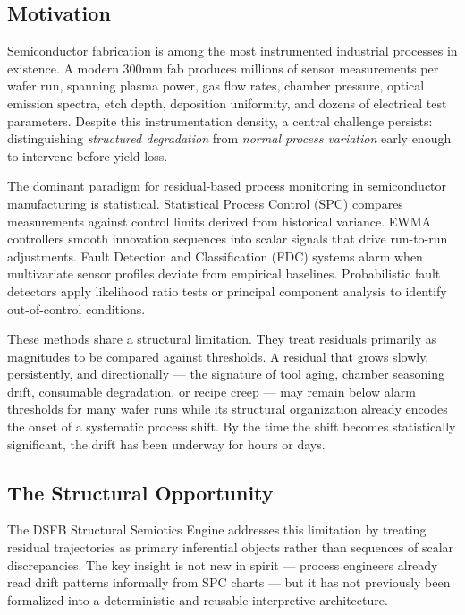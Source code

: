 \documentclass[11pt,letterpaper]{article}
\theoremstyle{scresult}
\begin{document}
\subsection{Motivation}

Semiconductor fabrication is among the most instrumented industrial processes
in existence. A modern 300mm fab produces millions of sensor measurements per
wafer run, spanning plasma power, gas flow rates, chamber pressure, optical
emission spectra, etch depth, deposition uniformity, and dozens of electrical
test parameters. Despite this instrumentation density, a central challenge
persists: distinguishing \emph{structured degradation} from \emph{normal
process variation} early enough to intervene before yield loss.

The dominant paradigm for residual-based process monitoring in semiconductor
manufacturing is statistical. Statistical Process Control (SPC) compares
measurements against control limits derived from historical variance. EWMA
controllers smooth innovation sequences into scalar signals that drive
run-to-run adjustments. Fault Detection and Classification (FDC) systems alarm
when multivariate sensor profiles deviate from empirical baselines. Probabilistic
fault detectors apply likelihood ratio tests or principal component analysis
to identify out-of-control conditions.

These methods share a structural limitation. They treat residuals primarily as
magnitudes to be compared against thresholds. A residual that grows slowly,
persistently, and directionally --- the signature of tool aging, chamber
seasoning drift, consumable degradation, or recipe creep --- may remain below
alarm thresholds for many wafer runs while its structural organization already
encodes the onset of a systematic process shift. By the time the shift becomes
statistically significant, the drift has been underway for hours or days.

\subsection{The Structural Opportunity}

The DSFB Structural Semiotics Engine addresses this limitation by treating
residual trajectories as primary inferential objects rather than sequences of
scalar discrepancies. The key insight is not new in spirit --- process engineers
already read drift patterns informally from SPC charts --- but it has not
previously been formalized into a deterministic and reusable
interpretive architecture.
\end{document}
